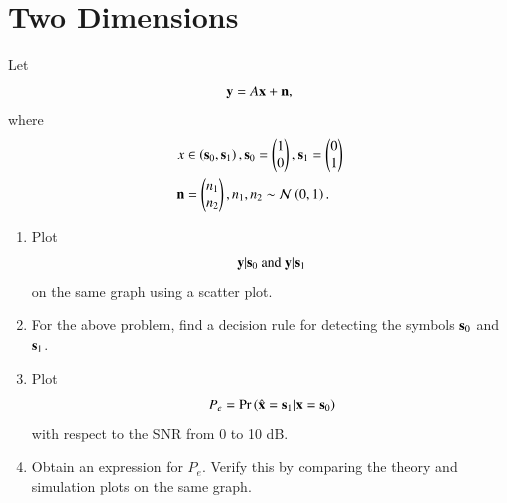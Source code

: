 \documentclass[journal,12pt,twocolumn]{IEEEtran}
\renewcommand\thesection{\arabic{section}}
\begin{document}
\section{Two Dimensions}
Let
\begin{equation}
    \mathbf{y} = A\mathbf{x} + \mathbf{n},
\end{equation}
where
\begin{align}
    x       & \in \left(\mathbf{s}_0,\mathbf{s}_1\right),
    \mathbf{s}_0 =
    \begin{pmatrix}
        1
        \\
        0
    \end{pmatrix},
    \mathbf{s}_1 =
    \begin{pmatrix}
        0
        \\
        1
    \end{pmatrix}
    \\
    \mathbf{n} & =
    \begin{pmatrix}
        n_1
        \\
        n_2
    \end{pmatrix},
    n_1,n_2 \sim \mathcal{N}\left(0,1\right).
\end{align}
%
\begin{enumerate}[label=\thesection.\arabic*
        ,ref=\thesection.\theenumi]
    \item
          \label{ch5_fsk}
          Plot
          \begin{equation}
              \mathbf{y}|\mathbf{s}_0 \text{ and } \mathbf{y}|\mathbf{s}_1
          \end{equation}
          on the same graph using a scatter plot.
    \item
          For the above problem, find a decision rule for detecting the symbols $\mathbf{s}_0 $ and $\mathbf{s}_1$.
    \item
          Plot
          \begin{equation}
              P_e = \Pr\left(\hat{\mathbf{x}} = \mathbf{s}_1|\mathbf{x} = \mathbf{s}_0\right)
          \end{equation}
          with respect to the SNR from 0 to 10 dB.
    \item
          Obtain an expression for $P_e$. Verify this by comparing the theory and simulation plots on the same graph.
\end{enumerate}
\end{document}
